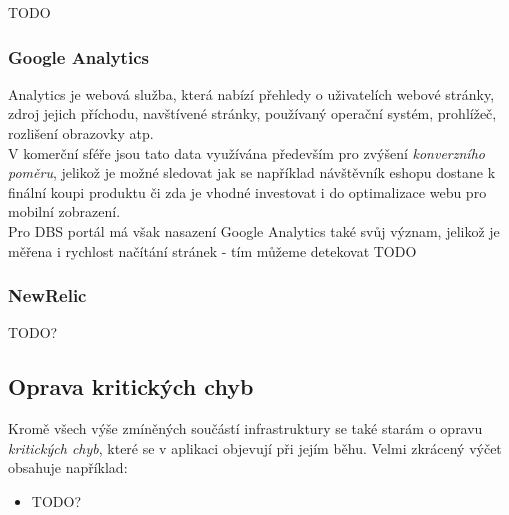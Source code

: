 TODO

\subsubsection{Google Analytics}

Analytics \cite{ga} je webová služba, která nabízí přehledy o uživatelích webové stránky, zdroj jejich příchodu, navštívené stránky, používaný operační systém, prohlížeč, rozlišení obrazovky atp.\\
V komerční sféře jsou tato data využívána především pro zvýšení \emph{konverzního poměru}, jelikož je možné sledovat jak se například návštěvník eshopu dostane k finální koupi produktu či zda je vhodné investovat i do optimalizace webu pro mobilní zobrazení.\\
Pro DBS portál má však nasazení Google Analytics také svůj význam, jelikož je měřena i rychlost načítání stránek - tím můžeme detekovat TODO 

\subsubsection{NewRelic}

TODO?

\subsection{Oprava kritických chyb}

Kromě všech výše zmíněných součástí infrastruktury se také starám o opravu \emph{kritických chyb}, které se v aplikaci objevují při jejím běhu. Velmi zkrácený výčet obsahuje například:
\begin{itemize}
	\item TODO?
\end{itemize}
